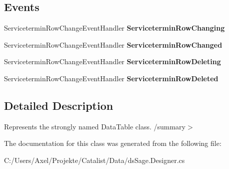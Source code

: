 \subsection*{Events}
\begin{DoxyCompactItemize}
\item 
Servicetermin\+Row\+Change\+Event\+Handler {\bfseries Servicetermin\+Row\+Changing}\hypertarget{class_products_1_1_data_1_1ds_sage_1_1_servicetermin_data_table_ad26e4fbc62d55f294dfc146e188a7d88}{}\label{class_products_1_1_data_1_1ds_sage_1_1_servicetermin_data_table_ad26e4fbc62d55f294dfc146e188a7d88}

\item 
Servicetermin\+Row\+Change\+Event\+Handler {\bfseries Servicetermin\+Row\+Changed}\hypertarget{class_products_1_1_data_1_1ds_sage_1_1_servicetermin_data_table_a99c722d1a1bded72a6ffa0410a2aa9c0}{}\label{class_products_1_1_data_1_1ds_sage_1_1_servicetermin_data_table_a99c722d1a1bded72a6ffa0410a2aa9c0}

\item 
Servicetermin\+Row\+Change\+Event\+Handler {\bfseries Servicetermin\+Row\+Deleting}\hypertarget{class_products_1_1_data_1_1ds_sage_1_1_servicetermin_data_table_a113c5f335ceed1c9c7d03ba2d864f19d}{}\label{class_products_1_1_data_1_1ds_sage_1_1_servicetermin_data_table_a113c5f335ceed1c9c7d03ba2d864f19d}

\item 
Servicetermin\+Row\+Change\+Event\+Handler {\bfseries Servicetermin\+Row\+Deleted}\hypertarget{class_products_1_1_data_1_1ds_sage_1_1_servicetermin_data_table_a389b453640c82faafb2100e52541f809}{}\label{class_products_1_1_data_1_1ds_sage_1_1_servicetermin_data_table_a389b453640c82faafb2100e52541f809}

\end{DoxyCompactItemize}


\subsection{Detailed Description}
Represents the strongly named Data\+Table class. /summary$>$ 

The documentation for this class was generated from the following file\+:\begin{DoxyCompactItemize}
\item 
C\+:/\+Users/\+Axel/\+Projekte/\+Catalist/\+Data/ds\+Sage.\+Designer.\+cs\end{DoxyCompactItemize}
